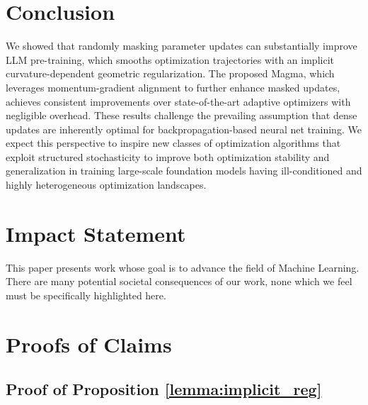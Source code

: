 \documentclass[11pt, a4paper, twocolumn, copyright, goog]{google}
\theoremstyle{plain}
\theoremstyle{definition}
\theoremstyle{remark}
\begin{document}
\section{Conclusion}
We showed that randomly masking parameter updates can substantially improve LLM pre-training, which smooths optimization trajectories with an implicit curvature-dependent geometric regularization. 
The proposed Magma, which leverages momentum-gradient alignment to further enhance masked updates, achieves consistent improvements over state-of-the-art adaptive optimizers with negligible overhead. 
These results challenge the prevailing assumption that dense updates are inherently optimal for backpropagation-based neural net training. 
We expect this perspective to inspire new classes of optimization algorithms that exploit structured stochasticity to improve both optimization stability and generalization in training large-scale foundation models having ill-conditioned and highly heterogeneous optimization landscapes.

\section*{Impact Statement}
This paper presents work whose goal is to advance the field of Machine Learning. There are many potential societal consequences of our work, none which we feel must be specifically highlighted here.



% 

\newpage
\appendix
\onecolumn


\setcounter{table}{0}
\renewcommand{\thetable}{A\arabic{table}}

\setcounter{figure}{0}
\renewcommand{\thefigure}{A\arabic{figure}}



\section{Proofs of Claims} \label{appx:proofs}


\subsection{Proof of Proposition \ref{lemma:implicit_reg}} \label{appx:proof_prop1}
\end{document}
